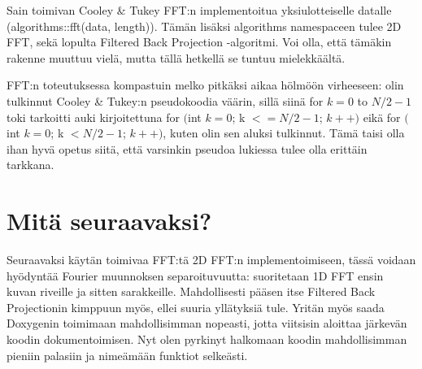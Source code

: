 \documentclass[12pt,a4paper]{report}
\begin{document}
    Sain toimivan Cooley \& Tukey FFT:n implementoitua yksiulotteiselle datalle (algorithms::fft(data, length)). Tämän lisäksi algorithms namespaceen tulee 2D FFT, sekä lopulta Filtered Back Projection -algoritmi. Voi olla, että tämäkin rakenne muuttuu vielä, mutta tällä hetkellä se tuntuu mielekkäältä.
    
    FFT:n toteutuksessa kompastuin melko pitkäksi aikaa hölmöön virheeseen: olin tulkinnut Cooley \& Tukey:n pseudokoodia väärin, sillä siinä for $k=0$ to $N/2-1$ toki tarkoitti auki kirjoitettuna for $($int $k=0$; k $<= N/2-1$; $k++)$ eikä for $($int $k=0$; k $< N/2-1$; $k++)$, kuten olin sen aluksi tulkinnut. Tämä taisi olla ihan hyvä opetus siitä, että varsinkin pseudoa lukiessa tulee olla erittäin tarkkana.
    
    \section*{Mitä seuraavaksi?}
    Seuraavaksi käytän toimivaa FFT:tä 2D FFT:n implementoimiseen, tässä voidaan hyödyntää Fourier muunnoksen separoituvuutta: suoritetaan 1D FFT ensin kuvan riveille ja sitten sarakkeille. Mahdollisesti pääsen itse Filtered Back Projectionin kimppuun myös, ellei suuria yllätyksiä tule.
    Yritän myös saada Doxygenin toimimaan mahdollisimman nopeasti, jotta viitsisin aloittaa järkevän koodin dokumentoimisen. Nyt olen pyrkinyt halkomaan koodin mahdollisimman pieniin palasiin ja nimeämään funktiot selkeästi.
     
\end{document}
